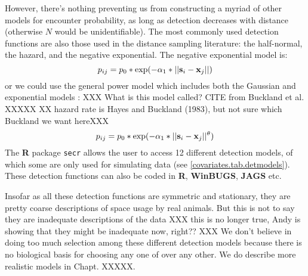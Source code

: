 However, there's nothing preventing us from constructing a myriad of
other models for encounter probability, as long as detection decreases
with distance (otherwise $N$ would be unidentifiable). The most
commonly used detection functions are also those used in the distance
sampling literature: the half-normal, the hazard, and the negative
exponential.  The negative exponential model is: 
\[
p_{ij} = p_{0}*\exp(-\alpha_{1} *||{\bf s}_{i}-{\bf x}_{j}||)
\]
or we could use the general power model which includes both the
Gaussian and exponential models \citep{russell_etal:2012}: XXX What is
this model called? CITE from Buckland et al. XXXXX
XX hazard rate is Hayes and Buckland (1983), but not sure which Buckland we want hereXXX
\[
p_{ij} = p_{0}*\exp(-\alpha_{1} *||{\bf s}_{i}-{\bf x}_{j}||^{\theta} )
\]
The {\bf R} package
{\tt secr} allows the user to access 12 different detection models, of which
some are only used for simulating data (see \ref{covariates.tab.detmodels}). These detection
functions can  also be coded in {\bf R}, {\bf WinBUGS},
{\bf JAGS} etc.

Insofar as all these detection functions are symmetric and stationary, they are pretty
coarse descriptions of space usage by real animals. But this is not to
say they are inadequate descriptions of the data XXX this is no longer true, Andy
is showing that they might be inadequate now, right?? XXX
We don't believe in doing too much
selection among these different detection models because there is no biological basis for
choosing any one of over any other. We do describe more
realistic models in Chapt. XXXXX.


